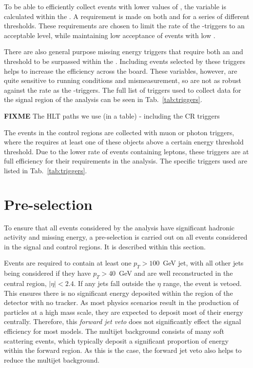 To be able to efficiently collect events with lower
values of \HT, the \alphat variable is calculated within the \HLT. A
requirement is made on both \alphat and \HT for a series of different
\HT thresholds. These requirements are chosen to limit the rate of the
\alphat-\HT triggers to an acceptable level, while maintaining low
acceptance of events with low \HT. 

There are also general purpose missing energy triggers that require
both an \MHT and \MET threshold to be surpassed within the \HLT.
Including events selected by these triggers helps to increase the
efficiency across the board. These variables, however, are quite sensitive to
running conditions and mismeasurement, so are not as robust against
the \HLT rate as the \alphat-\HT triggers. The full list of
triggers used to collect data for the signal region of the \alphat
analysis can be seen in Tab.~\ref{tab:triggers}.

{\bf FIXME} The HLT paths we use (in a table) - including the CR
triggers

The events in the control regions are collected with muon or photon
triggers, where the \HLT requires at least one of these objects above
a certain energy threshold threshold. Due to the lower rate of events
containing leptons, these triggers are at full efficiency for their
requirements in the analysis. The specific triggers used are listed in
Tab.~\ref{tab:triggers}.

\section{Pre-selection}%
\label{sec:preselection}

To ensure that all events considered by the analysis have
significant hadronic activity and missing energy, a pre-selection is
carried out on all events considered in the signal and control
regions. It is described within this section.

Events are required to contain at least one $p_T>100$~GeV jet,
with all other jets being considered if they have $p_T>40$~GeV and are
well reconstructed in the central region, $|\eta|<2.4$. If any jets
fall outside the $\eta$ range, the event is vetoed. This ensures there
is no significant energy deposited within the region of the detector
with no tracker. As most \BSM physics scenarios result in the
production of particles at a high mass scale, they are expected to deposit
most of their energy centrally. Therefore, this \emph{forward jet
veto} does not significantly effect the signal efficiency for most
models. The \QCD multijet background consists of many
soft scattering events, which typically deposit a significant
proportion of energy within the forward region. As this is the case,
the forward jet veto also helps to reduce the multijet
background.

